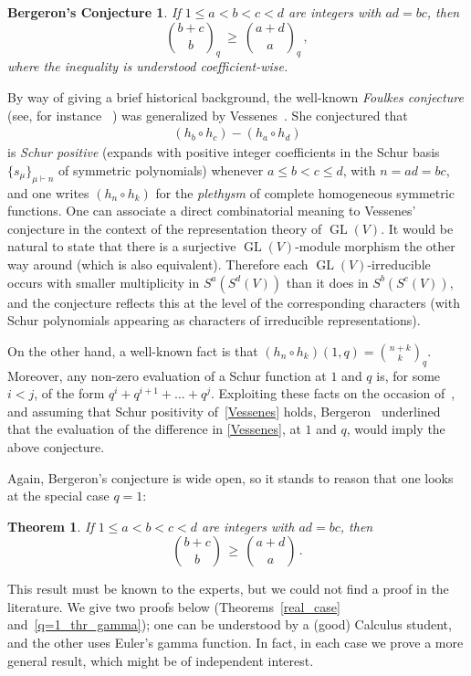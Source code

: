 \documentclass[11pt]{amsart}
\newtheorem{theorem}{Theorem} %
\newtheorem*{bconjecture}{Bergeron's Conjecture}
\newcommand\GL{\operatorname{GL}}
\newcommand{\gauss}[2]{{\binom{#1}{#2}}_q}
\begin{document}
\begin{bconjecture}
{\it If $1\leq a<b<c<d$ are integers with $ad=bc$, then
$$\gauss{b+c}b \ \geq \ \gauss{a+d}a \, ,$$
where the inequality is understood coefficient-wise.}
\end{bconjecture}

By way of giving a brief historical background, the well-known \emph{Foulkes conjecture} (see, for instance ~\cite{bergeron2}) was generalized by Vessenes~\cite{vessenes}. 
She conjectured that 
\begin{align} \label{Vessenes}
(h_b\circ h_c) - (h_a \circ h_d)
\end{align}
is \emph{Schur positive} (expands with positive integer coefficients in the Schur basis $\{s_{\mu}\}_{\mu\vdash n}$ of
symmetric polynomials) whenever $a\leq b<c \leq d$, with $n=ad=bc$, and one writes $(h_n\circ h_k)$ for the
\emph{plethysm} of complete homogeneous symmetric functions. 
One can associate a direct combinatorial meaning to 
Vessenes' conjecture in the context of the representation theory
of $\GL(V)$. It would be natural to state that there is a surjective $\GL(V)$-module morphism the other way around
(which is also equivalent). Therefore each $\GL(V)$-irreducible occurs with smaller multiplicity in $S^a(S^d(V))$ than it does in $S^b(S^c(V))$, 
and the conjecture reflects this at the level of the corresponding characters 
(with Schur polynomials appearing as characters of irreducible representations). 

On the other hand, a well-known fact is that $(h_n\circ h_k)(1,q)=\binom{n+k}{k}_q$. Moreover, any non-zero evaluation of a Schur function 
at $1$ and $q$ is, for some $i<j$, of the form $q^i+q^{i+1}+\dots + q^j$. Exploiting these facts on the occasion of~\cite{bergeron}, and assuming that
Schur positivity of~\eqref{Vessenes} holds, Bergeron~\cite{bergeron2} underlined that the evaluation of the difference in \eqref{Vessenes}, at $1$ and $q$, 
would imply the above conjecture.

Again, Bergeron's conjecture is wide open, so it stands to reason that one looks at the special case $q=1$:

\begin{theorem}\label{thm:q=1_case}  If $1\leq a<b<c<d$ are integers with $ad=bc$, then
$$\binom{b+c}b \, \geq \, \binom{a+d}a \, .$$
\end{theorem} 

This result must be known to the experts, but we could not find a proof in the literature.
We give two proofs below (Theorems~\ref{real_case} and~\ref{q=1_thr_gamma}); one can be understood by a
(good) Calculus student, and the other uses Euler's gamma function.
In fact, in each case we prove a more general result, which might be of independent interest.
\end{document}
